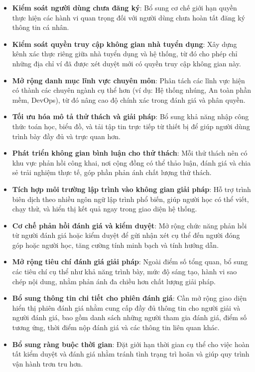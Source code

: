 \begin{itemize}
  \item \textbf{Kiểm soát người dùng chưa đăng ký}: Bổ sung cơ chế giới hạn quyền thực hiện các hành vi quan trọng đối với người dùng chưa hoàn tất đăng ký thông tin cá nhân.
  \item \textbf{Kiểm soát quyền truy cập không gian nhà tuyển dụng}: Xây dựng kênh xác thực riêng giữa nhà tuyển dụng và hệ thống, từ đó cho phép chỉ những địa chỉ ví đã được xét duyệt mới có quyền truy cập không gian này.
  \item \textbf{Mở rộng danh mục lĩnh vực chuyên môn}: Phân tách các lĩnh vực hiện có thành các chuyên ngành cụ thể hơn (ví dụ: Hệ thống nhúng, An toàn phần mềm, DevOps), từ đó nâng cao độ chính xác trong đánh giá và phân quyền.
  \item \textbf{Tối ưu hóa mô tả thử thách và giải pháp}: Bổ sung khả năng nhập công thức toán học, biểu đồ, và tải tập tin trực tiếp từ thiết bị để giúp người dùng trình bày đầy đủ và trực quan hơn.
  \item \textbf{Phát triển không gian bình luận cho thử thách}: Mỗi thử thách nên có khu vực phản hồi công khai, nơi cộng đồng có thể thảo luận, đánh giá và chia sẻ trải nghiệm thực tế, góp phần phản ánh chất lượng thử thách.
  \item \textbf{Tích hợp môi trường lập trình vào không gian giải pháp}: Hỗ trợ trình biên dịch theo nhiều ngôn ngữ lập trình phổ biến, giúp người học có thể viết, chạy thử, và hiển thị kết quả ngay trong giao diện hệ thống.
  \item \textbf{Cơ chế phản hồi đánh giá và kiểm duyệt}: Mở rộng chức năng phản hồi từ người đánh giá hoặc kiểm duyệt để gửi nhận xét cụ thể đến người đóng góp hoặc người học, tăng cường tính minh bạch và tính hướng dẫn.
  \item \textbf{Mở rộng tiêu chí đánh giá giải pháp}: Ngoài điểm số tổng quan, bổ sung các tiêu chí cụ thể như khả năng trình bày, mức độ sáng tạo, hành vi sao chép nội dung, nhằm phản ánh đa chiều hơn chất lượng giải pháp.
  \item \textbf{Bổ sung thông tin chi tiết cho phiên đánh giá}: Cần mở rộng giao diện hiển thị phiên đánh giá nhằm cung cấp đầy đủ thông tin cho người giải và người đánh giá, bao gồm danh sách những người tham gia đánh giá, điểm số tương ứng, thời điểm nộp đánh giá và các thông tin liên quan khác.
  \item \textbf{Bổ sung ràng buộc thời gian}: Đặt giới hạn thời gian cụ thể cho việc hoàn tất kiểm duyệt và đánh giá nhằm tránh tình trạng trì hoãn và giúp quy trình vận hành trơn tru hơn.

\end{itemize}
